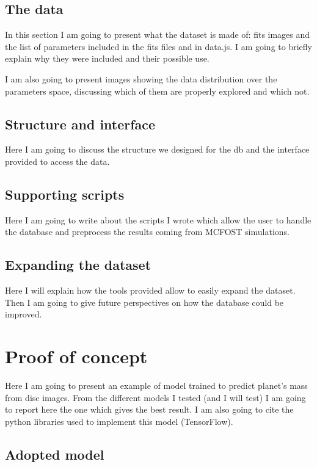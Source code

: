 \documentclass[a4paper,10pt]{report}
\begin{document}
\section{The data}

In this section I am going to present what the dataset is made of: fits images and the list of parameters included in the fits files 
and in data.js. I am going to briefly explain why they were included and their possible use.

I am also going to present images showing the data distribution over the parameters space, discussing
 which of them are properly explored and which not.

\section{Structure and interface}

Here I am going to discuss the structure we designed for the db and the interface provided to 
access the data.

\section{Supporting scripts}

Here I am going to write about the scripts I wrote which allow the user to handle the database
and preprocess the results coming from MCFOST simulations.

\section{Expanding the dataset}

Here I will explain how the tools provided allow to easily expand the dataset. 
Then I am going to give future perspectives on how the database could be improved.

\chapter{Proof of concept}

Here I am going to present an example of model trained to predict planet's mass from 
disc images.
From the different models I tested (and I will test)
I am going to report here the one which gives the best result.
I am also going to cite the python libraries used to implement this model (TensorFlow).

\section{Adopted model}
\end{document}
